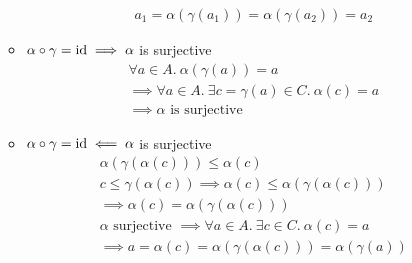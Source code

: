 \begin{exercise}
\begin{enumerate}[(1)]
\begin{itemize}
\begin{gather*}
                a_1 = \alpha(\gamma(a_1)) = \alpha(\gamma(a_2)) = a_2
            \end{gather*} 
            \item $\alpha \circ \gamma = \operatorname{id} \implies \alpha$ is surjective
            \begin{gather*}
                \forall a \in A.\ \alpha(\gamma(a)) = a \\
                \implies \forall a \in A.\ \exists c = \gamma(a) \in C.\ \alpha(c) = a \\
                \implies \alpha \text{ is surjective}
            \end{gather*}
            \item $\alpha \circ \gamma = \operatorname{id} \impliedby \alpha$ is surjective
            \begin{gather*}
                \alpha(\gamma(\alpha(c))) \leq \alpha(c) \\
                c \leq \gamma(\alpha(c))
                \implies \alpha(c) \leq \alpha(\gamma(\alpha(c))) \\
                \implies \alpha(c) = \alpha(\gamma(\alpha(c))) \\
                \alpha \text{ surjective } \implies \forall a \in A.\ \exists c \in C.\ \alpha(c) = a \\
                \implies a = \alpha(c) = \alpha(\gamma(\alpha(c))) = \alpha(\gamma(a))
            \end{gather*}
        \end{itemize}
    \end{enumerate}
\end{exercise}

